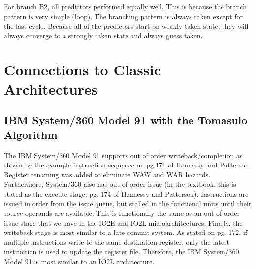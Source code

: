 \documentclass[10pt]{article}
\begin{document}
For branch B2, all predictors performed equally well. This is because the branch pattern is very simple (loop). The branching pattern is always taken except for the last cycle. Because all of the predictors start on weakly taken state, they will always converge to a strongly taken state and always guess taken.\\

\cleardoublepage
\section{Connections to Classic Architectures}

\subsection{IBM System/360 Model 91 with the Tomasulo Algorithm}
The IBM System/360 Model 91 supports out of order writeback/completion as shown by the example instruction sequence on pg.171 of Hennessy and Patterson. Register renaming was added to eliminate WAW and WAR hazards. Furthermore, System/360 also has out of order issue (in the textbook, this is stated as the execute stage; pg. 174 of Hennessy and Patterson). Instructions are issued in order from the issue queue, but stalled in the functional units until their source operands are available. This is functionally the same as an out of order issue stage that we have in the IO2E and IO2L microarchitectures. Finally, the writeback stage is most similar to a late commit system. As stated on pg. 172, if multiple instructions write to the same destination register, only the latest instruction is used to update the register file. Therefore, the IBM System/360 Model 91 is most similar to an IO2L architecture. 
\end{document}
